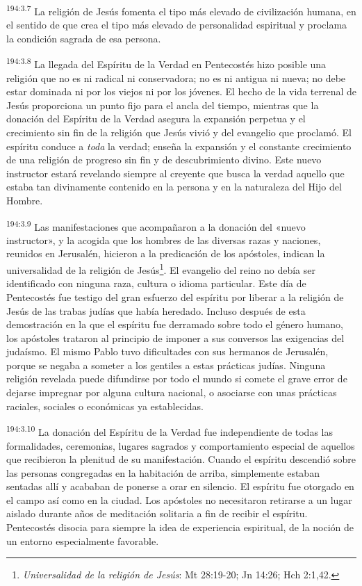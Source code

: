 \par
\textsuperscript{194:3.7} La religión de Jesús fomenta el tipo más elevado de civilización humana, en el sentido de que crea el tipo más elevado de personalidad espiritual y proclama la condición sagrada de esa persona.

\par
\textsuperscript{194:3.8} La llegada del Espíritu de la Verdad en Pentecostés hizo posible una religión que no es ni radical ni conservadora; no es ni antigua ni nueva; no debe estar dominada ni por los viejos ni por los jóvenes. El hecho de la vida terrenal de Jesús proporciona un punto fijo para el ancla del tiempo, mientras que la donación del Espíritu de la Verdad asegura la expansión perpetua y el crecimiento sin fin de la religión que Jesús vivió y del evangelio que proclamó. El espíritu conduce a \textit{toda} la verdad; enseña la expansión y el constante crecimiento de una religión de progreso sin fin y de descubrimiento divino. Este nuevo instructor estará revelando siempre al creyente que busca la verdad aquello que estaba tan divinamente contenido en la persona y en la naturaleza del Hijo del Hombre.

\par
\textsuperscript{194:3.9} Las manifestaciones que acompañaron a la donación del «nuevo instructor», y la acogida que los hombres de las diversas razas y naciones, reunidos en Jerusalén, hicieron a la predicación de los apóstoles, indican la universalidad de la religión de Jesús\footnote{\textit{Universalidad de la religión de Jesús}: Mt 28:19-20; Jn 14:26; Hch 2:1,42.}. El evangelio del reino no debía ser identificado con ninguna raza, cultura o idioma particular. Este día de Pentecostés fue testigo del gran esfuerzo del espíritu por liberar a la religión de Jesús de las trabas judías que había heredado. Incluso después de esta demostración en la que el espíritu fue derramado sobre todo el género humano, los apóstoles trataron al principio de imponer a sus conversos las exigencias del judaísmo. El mismo Pablo tuvo dificultades con sus hermanos de Jerusalén, porque se negaba a someter a los gentiles a estas prácticas judías. Ninguna religión revelada puede difundirse por todo el mundo si comete el grave error de dejarse impregnar por alguna cultura nacional, o asociarse con unas prácticas raciales, sociales o económicas ya establecidas.

\par
\textsuperscript{194:3.10} La donación del Espíritu de la Verdad fue independiente de todas las formalidades, ceremonias, lugares sagrados y comportamiento especial de aquellos que recibieron la plenitud de su manifestación. Cuando el espíritu descendió sobre las personas congregadas en la habitación de arriba, simplemente estaban sentadas allí y acababan de ponerse a orar en silencio. El espíritu fue otorgado en el campo así como en la ciudad. Los apóstoles no necesitaron retirarse a un lugar aislado durante años de meditación solitaria a fin de recibir el espíritu. Pentecostés disocia para siempre la idea de experiencia espiritual, de la noción de un entorno especialmente favorable.

